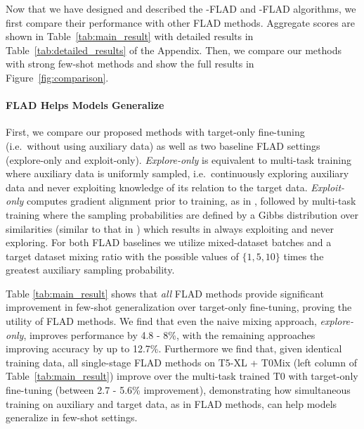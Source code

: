 Now that we have designed and described the \ex{}-FLAD and \ucb{}-FLAD algorithms, we first compare their performance with other FLAD methods. Aggregate scores are shown in Table~\ref{tab:main_result} with detailed results in Table~\ref{tab:detailed_results} of the Appendix. Then, we compare our methods with strong few-shot methods and show the full results in Figure~\ref{fig:comparison}.


\paragraph{FLAD Helps Models Generalize}
First, we compare our proposed methods with target-only fine-tuning (i.e.\ without using auxiliary data) as well as two baseline FLAD settings (explore-only and exploit-only). \textit{Explore-only} is equivalent to multi-task training where auxiliary data is uniformly sampled, i.e.\ continuously exploring auxiliary data and never exploiting knowledge of its relation to the target data. \textit{Exploit-only} computes gradient alignment prior to training, as in \ucb{}, followed by multi-task training where the sampling probabilities are defined by a Gibbs distribution over similarities (similar to that in \ex{}) which results in always exploiting and never exploring. For both FLAD baselines we utilize mixed-dataset batches and a target dataset mixing ratio with the possible values of $\{1,5,10\}$ times the greatest auxiliary sampling probability.

Table \ref{tab:main_result} shows that \textit{all} FLAD methods provide significant improvement in few-shot generalization over target-only fine-tuning, proving the utility of FLAD methods. We find that even the naive mixing approach, \textit{explore-only}, improves performance by 4.8 - 8\%, with the remaining approaches improving accuracy by up to 12.7\%.
Furthermore we find that, given identical training data, all single-stage FLAD methods on T5-XL + T0Mix (left column of Table~\ref{tab:main_result}) improve over the multi-task trained T0 with target-only fine-tuning (between 2.7 - 5.6\% improvement), demonstrating how simultaneous training on auxiliary and target data, as in FLAD methods, can help models generalize in few-shot settings.

